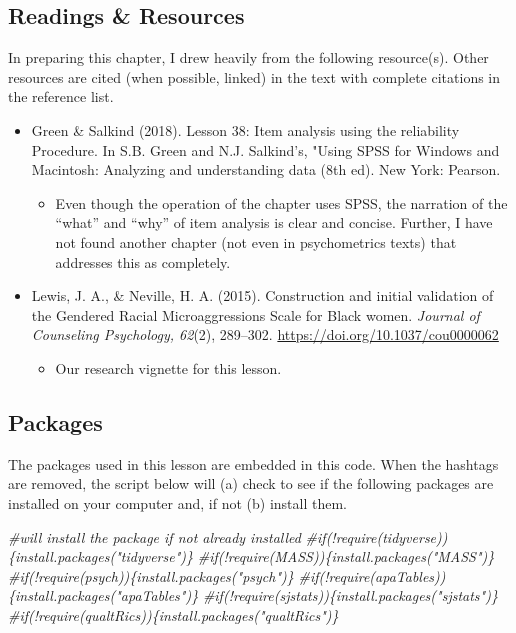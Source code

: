 \documentclass[
  english,
]{book}
\newenvironment{Shaded}{\begin{snugshade}}{\end{snugshade}}
\newcommand{\CommentTok}[1]{\textcolor[rgb]{0.56,0.35,0.01}{\textit{#1}}}
\providecommand{\tightlist}{%
  \setlength{\itemsep}{0pt}\setlength{\parskip}{0pt}}
\begin{document}
\hypertarget{readings-resources-5}{%
\subsection{Readings \& Resources}\label{readings-resources-5}}

In preparing this chapter, I drew heavily from the following resource(s). Other resources are cited (when possible, linked) in the text with complete citations in the reference list.

\begin{itemize}
\tightlist
\item
  Green \& Salkind (2018). Lesson 38: Item analysis using the reliability Procedure. In S.B. Green and N.J. Salkind's, "Using SPSS for Windows and Macintosh: Analyzing and understanding data (8th ed). New York: Pearson.

  \begin{itemize}
  \tightlist
  \item
    Even though the operation of the chapter uses SPSS, the narration of the ``what'' and ``why'' of item analysis is clear and concise. Further, I have not found another chapter (not even in psychometrics texts) that addresses this as completely.
  \end{itemize}
\item
  Lewis, J. A., \& Neville, H. A. (2015). Construction and initial validation of the Gendered Racial Microaggressions Scale for Black women. \emph{Journal of Counseling Psychology, 62}(2), 289--302. \url{https://doi.org/10.1037/cou0000062}

  \begin{itemize}
  \tightlist
  \item
    Our research vignette for this lesson.
  \end{itemize}
\end{itemize}

\hypertarget{packages-5}{%
\subsection{Packages}\label{packages-5}}

The packages used in this lesson are embedded in this code. When the hashtags are removed, the script below will (a) check to see if the following packages are installed on your computer and, if not (b) install them.

\begin{Shaded}
\begin{Highlighting}[]
\CommentTok{#will install the package if not already installed}
\CommentTok{#if(!require(tidyverse))\{install.packages("tidyverse")\}}
\CommentTok{#if(!require(MASS))\{install.packages("MASS")\}}
\CommentTok{#if(!require(psych))\{install.packages("psych")\}}
\CommentTok{#if(!require(apaTables))\{install.packages("apaTables")\}}
\CommentTok{#if(!require(sjstats))\{install.packages("sjstats")\}}
\CommentTok{#if(!require(qualtRics))\{install.packages("qualtRics")\}}
\end{Highlighting}
\end{Shaded}
\end{document}
